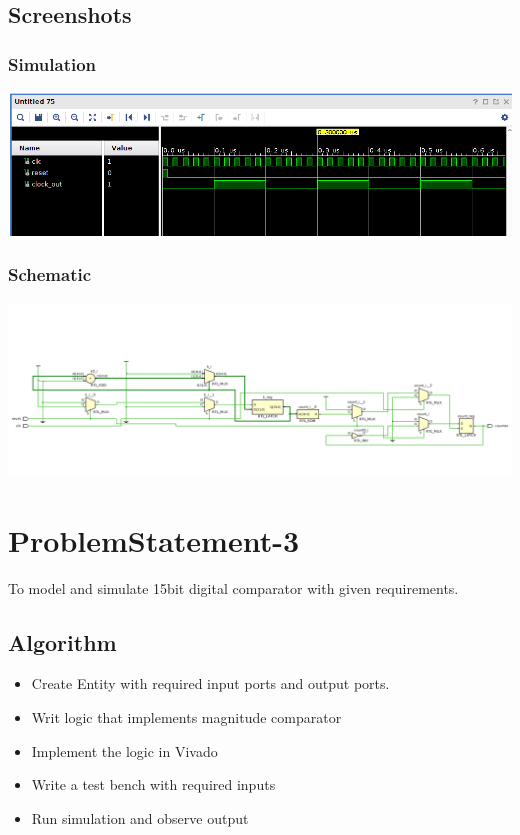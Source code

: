 \documentclass[12pt]{article}
\begin{document}
\subsection{Screenshots}
\subsubsection{Simulation}
\includegraphics[width=\linewidth]{lab10_ps2a.png}

\subsubsection{Schematic}
\includegraphics[width=\linewidth]{lab10_ps2b.png}

\newpage
\section{ProblemStatement-3}
 To model and simulate 15bit digital comparator with given requirements.
  
  \subsection{Algorithm}
  \begin{itemize}
  \item Create Entity with required input ports and output ports.
  \item Writ logic that implements magnitude comparator
  \item Implement the logic in Vivado
  \item Write a test bench with required inputs
  \item Run simulation and observe output
  \end{itemize}
 
\end{document}
